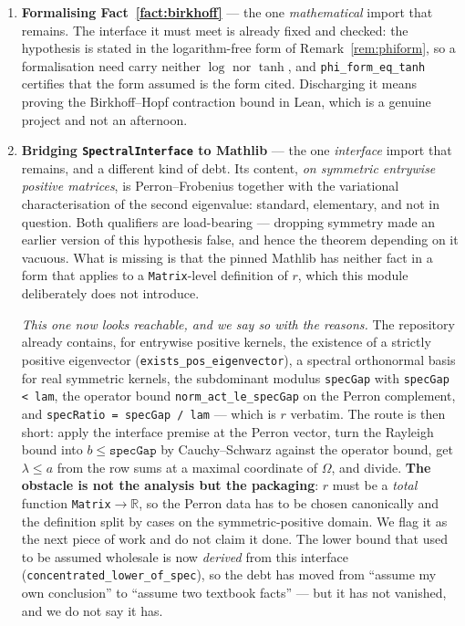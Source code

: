 \documentclass[11pt,a4paper]{article}
\theoremstyle{plain}
\theoremstyle{definition}
\begin{document}
\begin{enumerate}
\item \textbf{Formalising Fact~\ref{fact:birkhoff}} --- the one \emph{mathematical}
      import that remains. The interface it must meet is already fixed and
      checked: the hypothesis is stated in the logarithm-free form of
      Remark~\ref{rem:phiform}, so a formalisation need carry neither $\log$ nor
      $\tanh$, and \verb|phi_form_eq_tanh| certifies that the form assumed is the
      form cited. Discharging it means proving the Birkhoff--Hopf contraction
      bound in Lean, which is a genuine project and not an afternoon.
\item \textbf{Bridging \texttt{SpectralInterface} to Mathlib} --- the one
      \emph{interface} import that remains, and a different kind of debt. Its
      content, \emph{on symmetric entrywise positive matrices}, is
      Perron--Frobenius together with the variational characterisation of the
      second eigenvalue: standard, elementary, and not in question. Both
      qualifiers are load-bearing --- dropping symmetry made an earlier version
      of this hypothesis false, and hence the theorem depending on it vacuous.
      What is missing is that the pinned Mathlib has neither fact in
      a form that applies to a \texttt{Matrix}-level definition of $r$, which
      this module deliberately does not introduce.

      \emph{This one now looks reachable, and we say so with the reasons.} The
      repository already contains, for entrywise positive kernels, the existence
      of a strictly positive eigenvector (\verb|exists_pos_eigenvector|), a
      spectral orthonormal basis for real symmetric kernels, the subdominant
      modulus \verb|specGap| with \verb|specGap < lam|, the operator bound
      \verb|norm_act_le_specGap| on the Perron complement, and
      \verb|specRatio = specGap / lam| --- which is $r$ verbatim. The route is
      then short: apply the interface premise at the Perron vector, turn the
      Rayleigh bound into $b\le\texttt{specGap}$ by Cauchy--Schwarz against the
      operator bound, get $\lambda\le a$ from the row sums at a maximal
      coordinate of $\Omega$, and divide. \textbf{The obstacle is not the
      analysis but the packaging}: $r$ must be a \emph{total} function
      \texttt{Matrix}$\to\mathbb R$, so the Perron data has to be chosen
      canonically and the definition split by cases on the symmetric-positive
      domain. We flag it as the next piece of work and do not claim it done. The lower bound that used to
      be assumed wholesale is now \emph{derived} from this interface
      (\verb|concentrated_lower_of_spec|), so the debt has moved from ``assume my
      own conclusion'' to ``assume two textbook facts'' --- but it has not
      vanished, and we do not say it has.


\end{enumerate}
\end{document}

